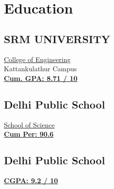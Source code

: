 \documentclass[]{resume-openfont}
\begin{document}
%
%
\lastupdated

%
%

%
%

\begin{minipage}[t]{0.33\textwidth} 


\section{Education} 

\subsection{SRM UNIVERSITY}
\href{https://drive.google.com/file/d/1ApRnYdoRtfoapCfFZCgwWubIP0cAW0eD/view?usp=share_link}{College of Engineering}\\
Kattankulathur Campus\\
\href{https://drive.google.com/file/d/1rq4FKQyNayOcX84-dDo-G0_RZiSQOdYV/view?usp=share_link}{ \bf Cum. GPA: 8.71 / 10}
\sectionsep

\subsection{Delhi Public School}
\href{https://drive.google.com/file/d/1x2eQDK6MQM5oL_1PCzpS03FXclnBQqGh/view?usp=share_link}{School of Science}\\
\href{https://drive.google.com/file/d/1xZmpfO4BpuHJuhc5C4YJIXDSf8b10sZq/view?usp=share_link}{\bf Cum Per: 90.6}
\sectionsep

\subsection{Delhi Public School}
\href{https://drive.google.com/file/d/1B54NoQXOFkvff8jHgBJ4f3W8yRxlJTO5/view?usp=share_link}{\bf CGPA: 9.2 / 10}
\sectionsep


\end{minipage}
\end{document}

